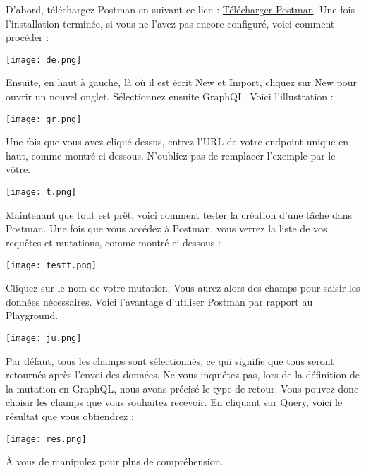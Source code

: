 \documentclass{article}
\begin{document}
D'abord, téléchargez Postman en suivant ce lien : \href{https://www.postman.com/downloads/}{Télécharger Postman}.
Une fois l'installation terminée, si vous ne l'avez pas encore configuré, voici comment procéder :

\begin{center} \texttt{[image: de.png]} \end{center}

Ensuite, en haut à gauche, là où il est écrit New et Import, cliquez sur New pour ouvrir un nouvel onglet. Sélectionnez ensuite GraphQL. Voici l'illustration :

\begin{center} \texttt{[image: gr.png]} \end{center}

Une fois que vous avez cliqué dessus, entrez l'URL de votre endpoint unique en haut, comme montré ci-dessous. N'oubliez pas de remplacer l'exemple par le vôtre.

\begin{center} \texttt{[image: t.png]} \end{center}
Maintenant que tout est prêt, voici comment tester la création d'une tâche dans Postman. Une fois que vous accédez à Postman, vous verrez la liste de vos requêtes et mutations, comme montré ci-dessous :

\begin{center} \texttt{[image: testt.png]} \end{center}

Cliquez sur le nom de votre mutation. Vous aurez alors des champs pour saisir les données nécessaires. Voici l'avantage d'utiliser Postman par rapport au Playground.

\begin{center} \texttt{[image: ju.png]} \end{center}

Par défaut, tous les champs sont sélectionnés, ce qui signifie que tous seront retournés après l'envoi des données. Ne vous inquiétez pas, lors de la définition de la mutation en GraphQL, nous avons précisé le type de retour. Vous pouvez donc choisir les champs que vous souhaitez recevoir. En cliquant sur Query, voici le résultat que vous obtiendrez :

\begin{center} \texttt{[image: res.png]} \end{center}
 À vous de manipulez pour plus de compréhension. 
\end{document}
